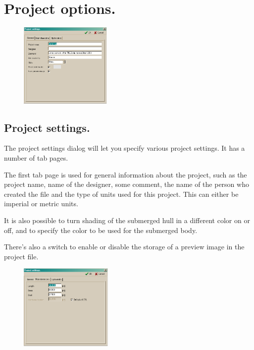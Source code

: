 \documentclass[12pt]{article}
\begin{document}
\pagebreak

\section{Project options.}

\begin{figure}
        \centering
        \includegraphics[width=0.4\textwidth,natwidth=401,natheight=363]{projectsettingsdialog-1.png}
        \caption{}
        \label{fig:projsettings1}
\end{figure}

\subsection{Project settings.} \label{project-settings}
The project settings dialog will let you specify various project
settings. It has a number of tab pages.

The first tab page is used for general information about the
project, such as the project name, name of the designer, some
comment, the name of the person who created the file and the
type of units used for this project. This can either be imperial or
metric units.

It is also possible to turn shading of the submerged hull in a
different color on or off, and to specify the color to be used for the
submerged body.

There's also a switch to enable or disable the storage of a
preview image in the project file.

\begin{figure}
        \centering
        \includegraphics[width=0.4\textwidth,natwidth=395,natheight=364]{projectsettingsdialog-2.png}
        \caption{}
        \label{fig:projsettings2}
\end{figure}
\end{document}
